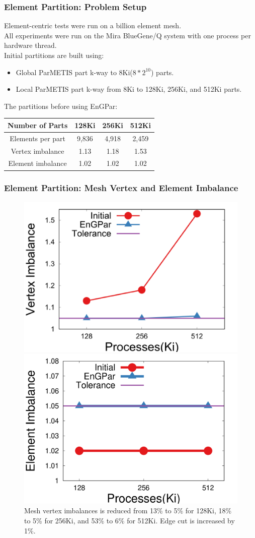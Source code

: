 \documentclass[aspectratio=169]{beamer}
\begin{document}
\begin{frame}
  \frametitle{Element Partition: Problem Setup}
  \medskip
  Element-centric tests were run on a billion element mesh. \\
  All experiments were run on the Mira BlueGene/Q system with one process per
  hardware thread. \\
  \smallskip
  Initial partitions are built using:
  \begin{itemize}
  \item Global ParMETIS part k-way to 8Ki($8*2^{10}$) parts.
  \item Local ParMETIS part k-way from 8Ki to 128Ki, 256Ki, and 512Ki parts.
  \end{itemize}
  The partitions before using EnGPar:\\
  \begin{table}[!h]
    \centering
    \begin{tabular}{||c|c|c|c||}
      \hline
      Number of Parts &128Ki&256Ki&512Ki \\
      \hline
      Elements per part & 9,836 & 4,918&2,459  \\
      \hline
      Vertex imbalance & 1.13 & 1.18 & 1.53 \\
      \hline
      Element imbalance & 1.02& 1.02& 1.02\\
      \hline
    \end{tabular}
  \end{table}
\end{frame}

\begin{frame}
  \frametitle{Element Partition: Mesh Vertex and Element Imbalance}
  \begin{figure}
    \centering
    \includegraphics[width=.49\textwidth]{../accelerated_cse19/figures/elmPtn_vtxImb.png}
    \includegraphics[width=.49\textwidth]{../accelerated_cse19/figures/elmPtn_elmImb.png} \\
    Mesh vertex imbalances is reduced from 13\% to 5\% for 128Ki, 18\% to 5\% for
    256Ki, and 53\% to 6\% for 512Ki.  Edge cut is increased by 1\%.
  \end{figure}  
\end{frame}
\end{document}
